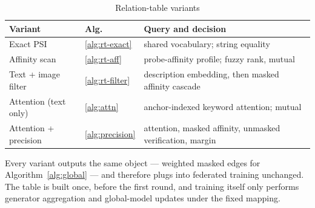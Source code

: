 \documentclass[conference]{IEEEtran}
\begin{document}
\begin{table}[t]
\caption{Relation-table variants}
\label{tab:variants}
\centering
\small
\begin{tabular}{@{}llp{}@{}}
\toprule
\textbf{Variant} & \textbf{Alg.} & \textbf{Query and decision} \\
\midrule
Exact PSI & \ref{alg:rt-exact} & shared vocabulary; string equality \\
Affinity scan & \ref{alg:rt-aff} & probe-affinity profile; fuzzy rank, mutual \\
Text + image filter & \ref{alg:rt-filter} & description embedding, then masked affinity cascade \\
Attention (text only) & \ref{alg:attn} & anchor-indexed keyword attention; mutual \\
Attention + precision & \ref{alg:precision} & attention, masked affinity, unmasked verification, margin \\
\bottomrule
\end{tabular}
\end{table}

Every variant outputs the same object --- weighted masked edges for
Algorithm~\ref{alg:global} --- and therefore plugs into federated
training unchanged. The table is built once, before the first round, and
training itself only performs generator aggregation and global-model
updates under the fixed mapping.
\end{document}
